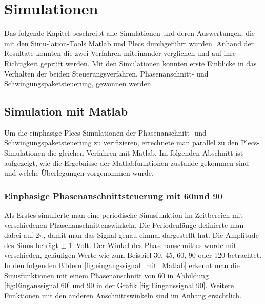 \section{Simulationen}

Das folgende Kapitel beschreibt alle Simulationen und deren Auswertungen, die mit den Simu-lation-Tools Matlab und Plecs durchgeführt wurden. Anhand der Resultate konnten die zwei Verfahren miteinander verglichen und auf ihre Richtigkeit geprüft werden. Mit den Simulationen konnten erste Einblicke in das Verhalten der beiden Steuerungsverfahren, Phasenanschnitt- und Schwingungspaketsteuerung, gewonnen werden.

\subsection{Simulation mit Matlab}
Um die einphasige Plecs-Simulationen der Phasenanschnitt- und Schwingungspaketsteuerung zu verifizieren, errechnete man parallel zu den Plecs-Simulationen die gleichen Verfahren mit Matlab. Im folgenden Abschnitt ist aufgezeigt, wie die Ergebnisse der Matlabfunktionen zustande gekommen sind und welche Überlegungen vorgenommen wurde.

\subsubsection{Einphasige Phasenanschnittsteuerung mit 60\textdegree und 90\textdegree}
Als Erstes simulierte man eine periodische Sinusfunktion im Zeitbereich mit verschiedenen Phasenanschnittenswinkeln. Die Periodenlänge definierte man dabei auf 2$\pi$, damit man das Signal genau einmal dargestellt hat. Die Amplitude des Sinus beträgt $\pm$ \SI{1}{Volt}. Der Winkel des Phasenanschnittes wurde mit verschieden, geläufigen Werte wie zum Beispiel 30\textdegree, 45\textdegree \hspace{0.02cm}, 60\textdegree \hspace{0.02cm}, 90\textdegree \hspace{0.02cm} oder 120\textdegree \hspace{0.02cm} betrachtet. In den folgenden Bildern \ref{fig:eingangssignal_mit_Matlab} erkennt man die Sinusfunktionen mit einem Phasenanschnitt von 60\textdegree \hspace{0.02cm} in Abbildung \ref{fig:Einganssignal 60} und 90\textdegree \hspace{0.02cm} in der Grafik \ref{fig:Einganssignal 90}. Weitere Funktionen mit den anderen Anschnittswinkeln sind im Anhang ersichtlich.
 

